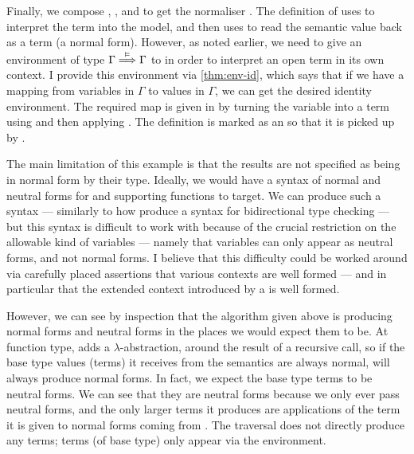 Finally, we compose , , and
 to get the normaliser .
The definition of  uses  to interpret the
term into the model, and then uses  to read the semantic
value back as a term (a normal form).
However, as noted earlier, we need to give an environment of type
$\Gamma \stackrel{\vDash}\Longrightarrow \Gamma$ to  in order to interpret an open
term in its own context.
I provide this environment via \cref{thm:env-id}, which says that if we have a
mapping from variables in $\Gamma$ to values in $\Gamma$, we can get the desired
identity environment.
The required map is given in
by turning the variable into a term using  and
then applying .
The definition  is marked as
an  so that it is picked up by
.


The main limitation of this example is that the results are not specified as
being in normal form by their type.
Ideally, we would have a syntax of normal and neutral forms for
 and supporting functions to target.
We can produce such a syntax --- similarly to how \citet{AACMM21} produce a
syntax for bidirectional type checking --- but this syntax is difficult to work
with because of the crucial restriction on the allowable kind of variables ---
namely that variables can only appear as neutral forms, and not normal forms.
I believe that this difficulty could be worked around via carefully placed
assertions that various contexts are well formed --- and in particular that the
extended context introduced by a  is well formed.

However, we can see by inspection that the algorithm given above is producing
normal forms and neutral forms in the places we would expect them to be.
At function type,  adds a $\lambda$-abstraction, around
the result of a recursive call, so if the base type values (terms) it receives
from the semantics are always normal,  will always
produce normal forms.
In fact, we expect the base type terms to be neutral forms.
We can see that they are neutral forms because we only ever pass
 neutral forms, and the only larger terms it produces
are applications of the term it is given to normal forms coming from
.
The traversal  does not directly produce any terms; terms
(of base type) only appear via the environment.

